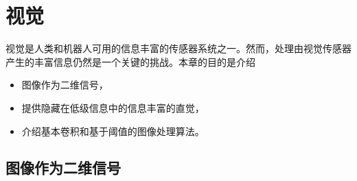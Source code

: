 \chapter{视觉}
\label{chap:vision}


视觉是人类和机器人可用的信息丰富的传感器系统之一。然而，处理由视觉传感器产生的丰富信息仍然是一个关键的挑战。本章的目的是介绍

\begin{itemize}

\item 图像作为二维信号，
\item 提供隐藏在低级信息中的信息丰富的直觉，
\item 介绍基本卷积和基于阈值的图像处理算法。
\end{itemize}

\section{图像作为二维信号}



